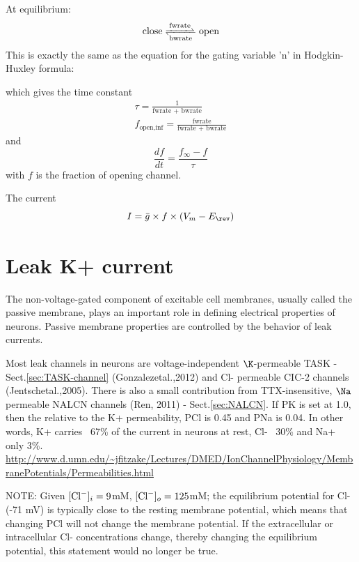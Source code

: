 At equilibrium:
\begin{equation}
\ce{\text{close} <=>[\text{fwrate}][\text{bwrate}] \text{open}}
\end{equation}
This is exactly the same as the equation for the gating variable 'n' in
Hodgkin-Huxley formula:

which gives the time constant
\begin{equation}
\begin{split}
\tau = \frac{1}{\text{fwrate + bwrate}} \\
f_\text{open,inf} =  \frac{\text{fwrate}}{\text{fwrate + bwrate}}
\end{split}
\end{equation}
and 
\begin{equation}
\frac{df}{dt} = \frac{f_\infty - f}{\tau}
\end{equation}
with $f$ is the fraction of opening channel.

The current 
\begin{equation}
I = \bar{g} \times f \times (V_m - E_\rev)
\end{equation}

\section{Leak K+ current}
\label{sec:leak-K+-current-models}

The non-voltage-gated component of excitable cell membranes, usually called the
passive membrane, plays an important role in defining electrical properties of
neurons. Passive membrane properties are controlled by the behavior of leak
currents. 

Most leak channels in neurons are voltage-independent $\K$-permeable TASK -
Sect.\ref{sec:TASK-channel} (Gonzalezetal.,2012) and Cl- permeable CIC-2
channels (Jentschetal.,2005). There is also a small contribution from
TTX-insensitive, $\Na$ permeable NALCN channels (Ren, 2011) -
Sect.\ref{sec:NALCN}.
If PK is set at 1.0, then the relative to the K+ permeability, PCl is 0.45 and
PNa is 0.04. In other words,
K+ carries ~67\% of the current in neurons at rest, Cl- ~30\%
and Na+ only 3\%.
\url{http://www.d.umn.edu/~jfitzake/Lectures/DMED/IonChannelPhysiology/MembranePotentials/Permeabilities.html}

NOTE: Given $[{\text{Cl}^{-}}]_i = 9$mM, $[{\text{Cl}^{-}}]_o = 125$mM; the equilibrium potential for
Cl- (-71 mV) is typically close to the resting membrane potential, which means
that changing PCl will not change the membrane potential.  If the extracellular
or intracellular Cl- concentrations change, thereby changing the equilibrium
potential, this statement would no longer be true.


